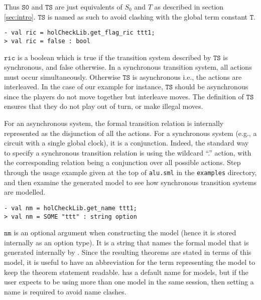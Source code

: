 Thus \(\mathtt{S0}\) and \(\mathtt{TS}\) are just \HOL{} equivalents of \(S_0\) and \(T\) as described in section \ref{sec:intro}. \( \mathtt{TS} \) is named as such to avoid clashing with the global \HOL{} term constant \( \mathtt{T} \).

\begin{session}\begin{verbatim}
- val ric = holCheckLib.get_flag_ric ttt1;
> val ric = false : bool
\end{verbatim}\end{session}

\(\mathtt{ric}\) is a boolean which is true if the transition system described by \(\mathtt{TS}\) is synchronous, and false otherwise. In a synchronous transition system, all actions must occur simultaneously. Otherwise \(\mathtt{TS}\) is asynchronous i.e., the actions are interleaved. In the case of our example for instance, \( \mathtt{TS} \) should be asynchronous since the players do not move together but interleave moves. The definition of \( \mathtt{TS} \) ensures that they do not play out of turn, or make illegal moves.

For an asynchronous system, the formal transition relation is internally represented as the disjunction of all the actions. For a synchronous system (e.g., a circuit with a single global clock), it is a conjunction. Indeed, the standard way to specify a synchronous transition relation is using the wildcard ``.'' action, with the corresponding relation being a conjunction over all possible actions. Step through the usage example given at the top of \texttt{alu.sml} in the \hc{} \texttt{examples} directory, and then examine the generated model to see how synchronous transition systems are modelled.

\begin{session}\begin{verbatim}
- val nm = holCheckLib.get_name ttt1;
> val nm = SOME "ttt" : string option
\end{verbatim}\end{session}

\(\mathtt{nm}\) is an optional argument when constructing the model (hence it is stored internally as an option type). It is a string that names the formal model that is generated internally by \hc{}. Since the resulting theorems are stated in terms of this model, it is useful to have an abbreviation for the term representing the model to keep the theorem statement readable. \hc{} has a default name for models, but if the user expects to be using more than one model in the same session, then setting a name is required to avoid name clashes.

